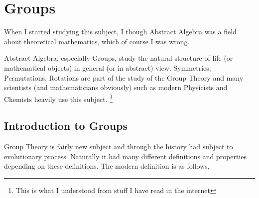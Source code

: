 \chapter{Groups}
When I started studying this subject, I though Abstract Algebra was a field about theoretical mathematics, which of course I was wrong.

Abstract Algebra, especially Groups, study the natural structure of life (or mathematical objects) in general (or in abstract) view.
Symmetries, Permutations, Rotations are part of the study of the Group Theory and many scientists (and mathematicians obviously) such as
modern Physicists and Chemists heavily use this subject.
\footnote{This is what I understood from stuff I have read in the internet}
\section{Introduction to Groups}
Group Theory is fairly new subject and through the history had subject to evolutionary process. Naturally it had many different definitions
and properties depending on these definitions. The modern definition is as follows,

